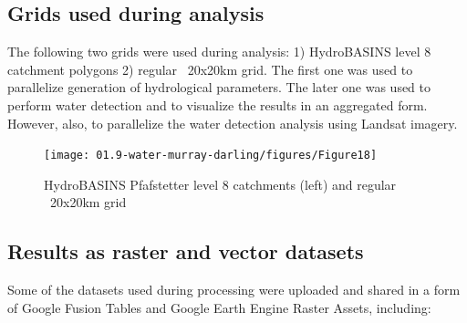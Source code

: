 \subsection{Grids used during analysis}

The following two grids were used during analysis: 1) HydroBASINS level 8 catchment polygons 2) regular ~20x20km grid. The first one was used to parallelize generation of hydrological parameters. The later one was used to perform water detection and to visualize the results in an aggregated form. However, also, to parallelize the water detection analysis using Landsat imagery.

\begin{figure}
	\centering
	\texttt{[image: 01.9-water-murray-darling/figures/Figure18]}
	\caption{HydroBASINS Pfafstetter level 8 catchments (left) and regular ~20x20km grid}
\end{figure}

\subsection{Results as raster and vector datasets}

Some of the datasets used during processing were uploaded and shared in a form of Google Fusion Tables and Google Earth Engine Raster Assets, including:


\begin{table}
	\centering
	\caption{List of vector and raster datasets available online}
	\label{table:au-datasets-output}
	\small
{}
\end{table}

